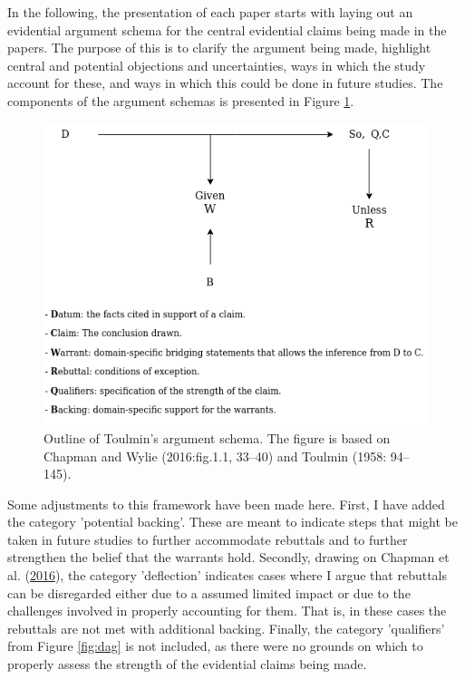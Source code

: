 \documentclass[
  a4paper,
  oneside]{uiophdthesis}
\begin{document}
In the following, the presentation of each paper starts with laying out an evidential argument schema for the central evidential claims being made in the papers. The purpose of this is to clarify the argument being made, highlight central and potential objections and uncertainties, ways in which the study account for these, and ways in which this could be done in future studies. The components of the argument schemas is presented in Figure \ref{fig:argument}.

\begin{figure}

{\centering \includegraphics[width=1\linewidth]{figures/argument_ex} 

}

\caption{Outline of Toulmin's argument schema. The figure is based on Chapman and Wylie (2016:fig.1.1, 33--40) and Toulmin (1958: 94--145).}\label{fig:argument}
\end{figure}

Some adjustments to this framework have been made here. First, I have added the category 'potential backing'. These are meant to indicate steps that might be taken in future studies to further accommodate rebuttals and to further strengthen the belief that the warrants hold. Secondly, drawing on Chapman et al. (\protect\hyperlink{ref-chapman2016}{2016}), the category 'deflection' indicates cases where I argue that rebuttals can be disregarded either due to a assumed limited impact or due to the challenges involved in properly accounting for them. That is, in these cases the rebuttals are not met with additional backing. Finally, the category 'qualifiers' from Figure \ref{fig:dag} is not included, as there were no grounds on which to properly assess the strength of the evidential claims being made.
\end{document}
